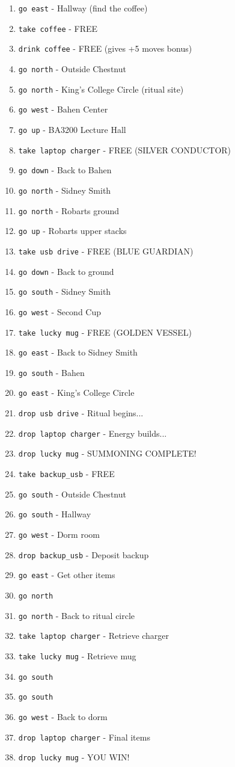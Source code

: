 \documentclass[12pt]{article}
\begin{document}
\begin{enumerate}
\item \texttt{go east} - Hallway (find the coffee)
\item \texttt{take coffee} - FREE
\item \texttt{drink coffee} - FREE (gives +5 moves bonus)
\item \texttt{go north} - Outside Chestnut
\item \texttt{go north} - King's College Circle (ritual site)
\item \texttt{go west} - Bahen Center
\item \texttt{go up} - BA3200 Lecture Hall
\item \texttt{take laptop charger} - FREE (SILVER CONDUCTOR)
\item \texttt{go down} - Back to Bahen
\item \texttt{go north} - Sidney Smith
\item \texttt{go north} - Robarts ground
\item \texttt{go up} - Robarts upper stacks
\item \texttt{take usb drive} - FREE (BLUE GUARDIAN)
\item \texttt{go down} - Back to ground
\item \texttt{go south} - Sidney Smith
\item \texttt{go west} - Second Cup
\item \texttt{take lucky mug} - FREE (GOLDEN VESSEL)
\item \texttt{go east} - Back to Sidney Smith
\item \texttt{go south} - Bahen
\item \texttt{go east} - King's College Circle
\item \texttt{drop usb drive} - Ritual begins...
\item \texttt{drop laptop charger} - Energy builds...
\item \texttt{drop lucky mug} - SUMMONING COMPLETE!
\item \texttt{take backup\_usb} - FREE
\item \texttt{go south} - Outside Chestnut
\item \texttt{go south} - Hallway
\item \texttt{go west} - Dorm room
\item \texttt{drop backup\_usb} - Deposit backup
\item \texttt{go east} - Get other items
\item \texttt{go north}
\item \texttt{go north} - Back to ritual circle
\item \texttt{take laptop charger} - Retrieve charger
\item \texttt{take lucky mug} - Retrieve mug
\item \texttt{go south}
\item \texttt{go south}
\item \texttt{go west} - Back to dorm
\item \texttt{drop laptop charger} - Final items
\item \texttt{drop lucky mug} - YOU WIN!
\end{enumerate}
\end{document}
